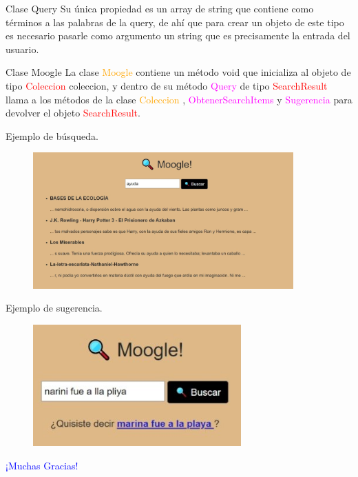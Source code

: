 \documentclass{beamer}
\begin{document}
\begin{frame}{Clase Query}
 Su única propiedad es un array de string que contiene como términos a las palabras de la query, de ahí que para crear un objeto de este tipo es necesario pasarle como argumento un string que es precisamente la entrada del usuario.

\end{frame}

\begin{frame}{Clase Moogle}
La clase \textcolor{orange}{Moogle} contiene un método void que inicializa al objeto de tipo \textcolor{red}{Coleccion} coleccion, y dentro de su método \textcolor{magenta}{Query} de tipo \textcolor{red}{SearchResult} llama a los métodos de la clase \textcolor{orange}{Coleccion} , \textcolor{magenta}{ObtenerSearchItems} y
 \textcolor{magenta}{Sugerencia} para devolver el objeto \textcolor{red}{SearchResult}.

\end{frame}
\begin{frame}{Ejemplo de búsqueda.}
\begin{figure}[h]
       \center
       \includegraphics[width=10cm]{Web1.jpg}
\end{figure}

\end{frame}


\begin{frame}{Ejemplo de sugerencia.}
\begin{figure}[h]
       \center
       \includegraphics[width=8cm]{Web4.jpg}
\end{figure}

\end{frame}


\begin{frame}
\huge \textcolor{blue}{¡Muchas Gracias!}
\end{frame}
\end{document}
